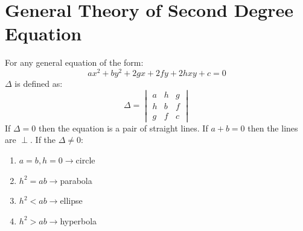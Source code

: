\chapter{General Theory of Second Degree Equation}
For any general equation of the form:
\begin{equation}
	ax^2+by^2+2gx+2fy+2hxy+c=0
\end{equation}
$\Delta$ is defined as:
\begin{equation}
	\Delta=\begin{vmatrix}
		a&h&g\\
		h&b&f\\
		g&f&c
	\end{vmatrix}
\end{equation}
If $\Delta=0$ then the equation is a pair of straight lines. If $a+b=0$ then the lines are $\perp$.\newline
If the $\Delta \neq 0$:
\begin{enumerate}
	\item $a=b, h=0\rightarrow$circle
	\item $h^2=ab\rightarrow$parabola
	\item $h^2<ab\rightarrow$ellipse
	\item $h^2>ab\rightarrow$hyperbola
\end{enumerate}
